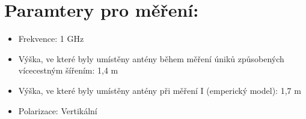 \section{Paramtery pro měření:}
\begin{itemize}
    \item Frekvence: 1 GHz
    \item Výška, ve které byly umístěny antény během měření úniků způsobených vícecestným šířením: 1,4 m
    \item Výška, ve které byly umístěny antény při měření I (emperický model): 1,7 m 
    \item Polarizace: Vertikální
\end{itemize}

